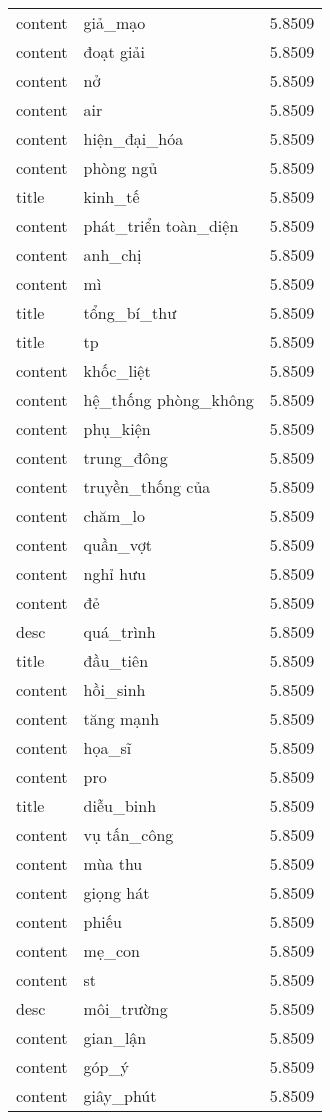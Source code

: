 \documentclass{article}
\begin{document}
\begin{tabular}{lll}
content & giả\_mạo & 5.8509\\
content & đoạt giải & 5.8509\\
content & nở & 5.8509\\
content & air & 5.8509\\
content & hiện\_đại\_hóa & 5.8509\\
content & phòng ngủ & 5.8509\\
title & kinh\_tế & 5.8509\\
content & phát\_triển toàn\_diện & 5.8509\\
content & anh\_chị & 5.8509\\
content & mì & 5.8509\\
title & tổng\_bí\_thư & 5.8509\\
title & tp & 5.8509\\
content & khốc\_liệt & 5.8509\\
content & hệ\_thống phòng\_không & 5.8509\\
content & phụ\_kiện & 5.8509\\
content & trung\_đông & 5.8509\\
content & truyền\_thống của & 5.8509\\
content & chăm\_lo & 5.8509\\
content & quần\_vợt & 5.8509\\
content & nghỉ hưu & 5.8509\\
content & đẻ & 5.8509\\
desc & quá\_trình & 5.8509\\
title & đầu\_tiên & 5.8509\\
content & hồi\_sinh & 5.8509\\
content & tăng mạnh & 5.8509\\
content & họa\_sĩ & 5.8509\\
content & pro & 5.8509\\
title & diễu\_binh & 5.8509\\
content & vụ tấn\_công & 5.8509\\
content & mùa thu & 5.8509\\
content & giọng hát & 5.8509\\
content & phiếu & 5.8509\\
content & mẹ\_con & 5.8509\\
content & st & 5.8509\\
desc & môi\_trường & 5.8509\\
content & gian\_lận & 5.8509\\
content & góp\_ý & 5.8509\\
content & giây\_phút & 5.8509\\

\end{tabular}
\end{document}
